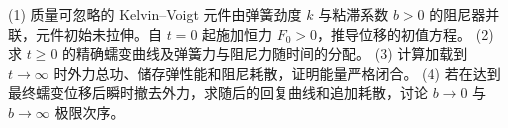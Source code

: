 (1) 质量可忽略的 Kelvin–Voigt 元件由弹簧劲度 \(k\) 与粘滞系数 \(b>0\) 的阻尼器并联，元件初始未拉伸。自 \(t=0\) 起施加恒力 \(F_0>0\)，推导位移的初值方程。
(2) 求 \(t\ge0\) 的精确蠕变曲线及弹簧力与阻尼力随时间的分配。
(3) 计算加载到 \(t\to\infty\) 时外力总功、储存弹性能和阻尼耗散，证明能量严格闭合。
(4) 若在达到最终蠕变位移后瞬时撤去外力，求随后的回复曲线和追加耗散，讨论 \(b\to0\) 与 \(b\to\infty\) 极限次序。
